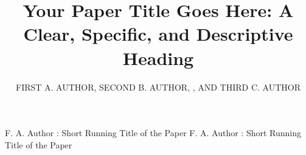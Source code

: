 
\title{Your Paper Title Goes Here:
A Clear, Specific, and Descriptive Heading}

\author{\uppercase{First A. Author},
\uppercase{Second B. Author}, ,
AND \uppercase{Third C. Author}}

\address[1]{Department, University/Institute, City 00000, Country
(e-mail: first.author@example.com; third.author@example.com)}
\address[2]{Department, Second Institute, City 00000, Country
(e-mail: second.author@example.com)}


\markboth
{F. A. Author \headeretal: Short Running Title of the Paper}
{F. A. Author \headeretal: Short Running Title of the Paper}

